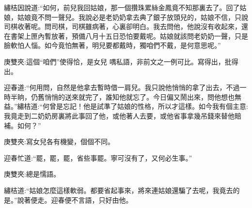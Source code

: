 \begin{parag}
    繡桔因說道:“如何，前兒我回姑娘，那一個攢珠累絲金鳳竟不知那裏去了。回了姑娘，姑娘竟不問一聲兒。我說必是老奶奶拿去典了銀子放頭兒的，姑娘不信，只說司棋收著呢。問司棋，司棋雖病著，心裏卻明白。我去問他，他說沒有收起來，還在書架上匣內暫放著，預備八月十五日恐怕要戴呢。姑娘就該問老奶奶一聲，只是臉軟怕人惱。如今竟怕無著，明兒要都戴時，獨咱們不戴，是何意思呢。”\begin{note}庚雙夾:這個“咱們”使得恰，是女兒 喁私語，非前文之一例可比。寫得出，批得出。\end{note}迎春道:“何用問，自然是他拿去暫時借一肩兒。我只說他悄悄的拿了出去，不過一時半晌，仍舊悄悄的送來就完了，誰知他就忘了。今日偏又鬧出來，問他想也無益。”繡桔道:“何曾是忘記！他是試準了姑娘的性格，所以才這樣。如今我有個主意:我竟走到二奶奶房裏將此事回了他，或他著人去要，或他省事拿幾吊錢來替他賠補。如何？”\begin{note}庚雙夾:寫女兒各有機變，個個不同。\end{note}迎春忙道:“罷，罷，罷，省些事罷。寧可沒有了，又何必生事。”\begin{note}庚雙夾:總是懦語。\end{note}繡桔道:“姑娘怎麼這樣軟弱。都要省起事來，將來連姑娘還騙了去呢，我竟去的是。”說著便走。迎春便不言語，只好由他。
\end{parag}


